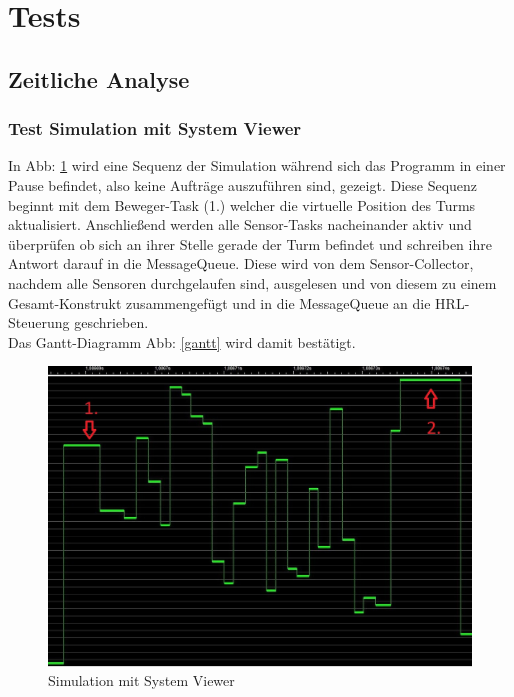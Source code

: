 \section{Tests}
\subsection{Zeitliche Analyse}
\subsubsection{Test Simulation mit System Viewer}
In Abb: \ref{fig4} wird eine Sequenz der Simulation während sich das Programm in einer Pause befindet, also keine Aufträge auszuführen sind, gezeigt. Diese Sequenz beginnt mit dem Beweger-Task (1.) welcher die virtuelle Position des Turms aktualisiert. Anschließend werden alle Sensor-Tasks nacheinander aktiv und überprüfen ob sich an ihrer Stelle gerade der Turm befindet und schreiben ihre Antwort darauf in die MessageQueue. Diese wird von dem Sensor-Collector, nachdem alle Sensoren durchgelaufen sind, ausgelesen und von diesem zu einem Gesamt-Konstrukt zusammengefügt und in die MessageQueue an die HRL-Steuerung geschrieben. \\
Das Gantt-Diagramm  Abb: \ref{gantt} wird damit bestätigt.

\begin{figure}[H]
	\centering
  \includegraphics[width=\textwidth]{diagrams/simulation_erklaerung.jpg}
	\caption{Simulation mit System Viewer}
	\label{fig4}
\end{figure}

